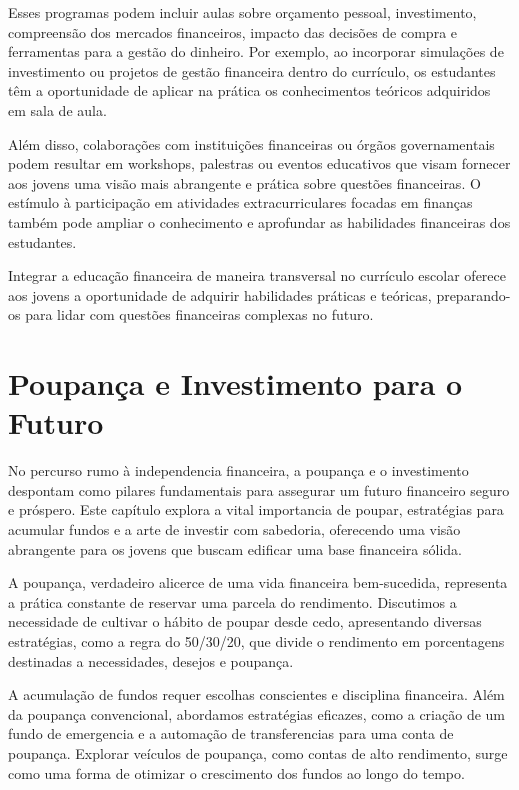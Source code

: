 \documentclass{report}
\begin{document}
Esses programas podem incluir aulas sobre orçamento pessoal, investimento, compreensão dos mercados financeiros, impacto das decisões de compra e ferramentas para a gestão do dinheiro. Por exemplo, ao incorporar simulações de investimento ou projetos de gestão financeira dentro do currículo, os estudantes têm a oportunidade de aplicar na prática os conhecimentos teóricos adquiridos em sala de aula.

Além disso, colaborações com instituições financeiras ou órgãos governamentais podem resultar em workshops, palestras ou eventos educativos que visam fornecer aos jovens uma visão mais abrangente e prática sobre questões financeiras. O estímulo à participação em atividades extracurriculares focadas em finanças também pode ampliar o conhecimento e aprofundar as habilidades financeiras dos estudantes.

Integrar a educação financeira de maneira transversal no currículo escolar oferece aos jovens a oportunidade de adquirir habilidades práticas e teóricas, preparando-os para lidar com questões financeiras complexas no futuro.

\chapter{Poupança e Investimento para o Futuro}
\label{chap:Poupança e Investimento para o Futuro}

No percurso rumo à independencia financeira, a poupança e o investimento despontam como pilares fundamentais para assegurar um futuro financeiro seguro e próspero. Este capítulo explora a vital importancia de poupar, estratégias para acumular fundos e a arte de investir com sabedoria, oferecendo uma visão abrangente para os jovens que buscam edificar uma base financeira sólida.

A poupança, verdadeiro alicerce de uma vida financeira bem-sucedida, representa a prática constante de reservar uma parcela do rendimento. Discutimos a necessidade de cultivar o hábito de poupar desde cedo, apresentando diversas estratégias, como a regra do 50/30/20, que divide o rendimento em porcentagens destinadas a necessidades, desejos e poupança.

A acumulação de fundos requer escolhas conscientes e disciplina financeira. Além da poupança convencional, abordamos estratégias eficazes, como a criação de um fundo de emergencia e a automação de transferencias para uma conta de poupança. Explorar veículos de poupança, como contas de alto rendimento, surge como uma forma de otimizar o crescimento dos fundos ao longo do tempo.
\end{document}
